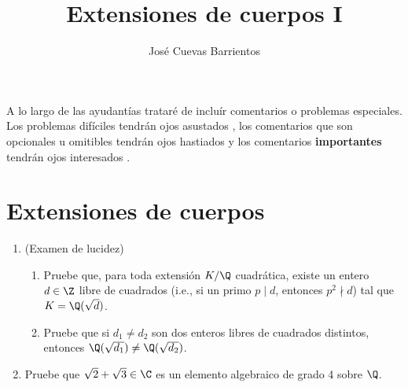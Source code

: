 \documentclass[11pt, reqno]{amsart}
\title{Extensiones de cuerpos I}
\date{\DTMdate{2025-03-13}}
\author{José Cuevas Barrientos}
\begin{document}
\maketitle

A lo largo de las ayudantías trataré de incluír comentarios o problemas especiales.
Los problemas difíciles tendrán ojos asustados {\straighteyes},
los comentarios que son opcionales u omitibles tendrán ojos hastiados {\upeyes}
y los comentarios \textbf{importantes} tendrán ojos interesados {\righteyes}.

\section{Extensiones de cuerpos}
\begin{enumerate}
	\item (Examen de lucidez)
		\begin{enumerate}
			\item Pruebe que, para toda extensión $K/\Q$ cuadrática, existe un entero $d \in \Z$ libre de cuadrados
				(i.e., si un primo $p \mid d$, entonces $p^2 \nmid d$) tal que $K = \Q(\sqrt{d})$.
			\item Pruebe que si $d_1 \ne d_2$ son dos enteros libres de cuadrados distintos, entonces
				$\Q(\sqrt{d_1}) \ne \Q(\sqrt{d_2})$.
		\end{enumerate}

	\item Pruebe que $\sqrt{2} + \sqrt{3} \in \C$ es un elemento algebraico de grado 4 sobre $\Q$.



\end{enumerate}
\end{document}
